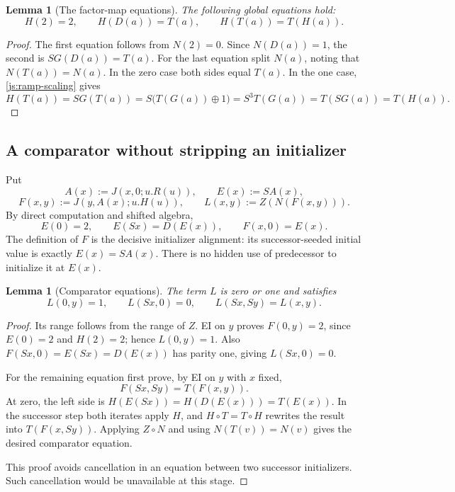 \documentclass[11pt]{article}
\newtheorem{lemma}[theorem]{Lemma}
\theoremstyle{definition}
\begin{document}
\begin{lemma}[The factor-map equations]\label{js:factor}
The following global equations hold:
\[
 H(2)=2,\qquad H(D(a))=T(a),\qquad H(T(a))=T(H(a)).
 \tag{Factor}\label{js:factor-equations}
\]
\end{lemma}
\begin{proof}
The first equation follows from $N(2)=0$.  Since $N(D(a))=1$,
the second is $S G(D(a))=T(a)$.
For the last equation split $N(a)$, noting that $N(T(a))=N(a)$.
In the zero case both sides equal $T(a)$.  In the one case,
\eqref{js:ramp-scaling} gives
\[
 H(T(a))=S G(T(a))
 =S\bigl(T(G(a))\oplus1\bigr)
 =S^3T(G(a))=T(SG(a))=T(H(a)).
\]
\end{proof}

\subsection{A comparator without stripping an initializer}

Put
\[
 A(x):=J(x,0;u.R(u)),\qquad E(x):=S A(x),
\]
\[
 F(x,y):=J(y,A(x);u.H(u)),\qquad
 L(x,y):=Z(N(F(x,y))).
\]
By direct computation and shifted algebra,
\[
 E(0)=2,\qquad E(Sx)=D(E(x)),\qquad F(x,0)=E(x).
\]
The definition of $F$ is the decisive initializer alignment:
its successor-seeded initial value is exactly $E(x)=S A(x)$.
There is no hidden use of predecessor to initialize it at $E(x)$.

\begin{lemma}[Comparator equations]\label{js:comparator}
The term $L$ is zero or one and satisfies
\[
 L(0,y)=1,\qquad L(Sx,0)=0,\qquad
 L(Sx,Sy)=L(x,y).
 \tag{Comparator}\label{js:comparator-equations}
\]
\end{lemma}
\begin{proof}
Its range follows from the range of $Z$.  EI on $y$ proves
$F(0,y)=2$, since $E(0)=2$ and $H(2)=2$; hence $L(0,y)=1$.
Also $F(Sx,0)=E(Sx)=D(E(x))$ has parity one, giving
$L(Sx,0)=0$.

For the remaining equation first prove, by EI on $y$ with $x$ fixed,
\[
 F(Sx,Sy)=T(F(x,y)).
\]
At zero, the left side is
$H(E(Sx))=H(D(E(x)))=T(E(x))$.  In the successor step both
iterates apply $H$, and $H\circ T=T\circ H$ rewrites the result
into $T(F(x,Sy))$.  Applying $Z\circ N$ and using
$N(T(v))=N(v)$ gives the desired comparator equation.

This proof avoids cancellation in an equation between two successor
initializers.  Such cancellation would be unavailable at this stage.
\end{proof}
\end{document}
